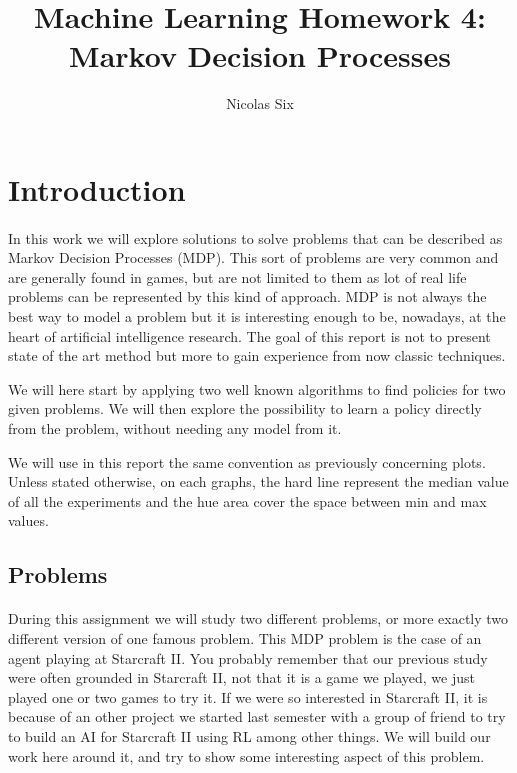 \documentclass[twocolumn,a4paper,10pt]{article}
\title{Machine Learning Homework 4:\\Markov Decision Processes}
\author{Nicolas Six}
\begin{document}
\maketitle \tableofcontents{}


\section{Introduction}

\paragraph{}

In this work we will explore solutions to solve problems that can
be described as Markov Decision Processes (MDP). This sort of problems
are very common and are generally found in games, but are not limited
to them as lot of real life problems can be represented by this kind
of approach. MDP is not always the best way to model a problem but
it is interesting enough to be, nowadays, at the heart of artificial
intelligence research. The goal of this report is not to present state
of the art method but more to gain experience from now classic techniques.

We will here start by applying two well known algorithms to find policies
for two given problems. We will then explore the possibility
to learn a policy directly from the problem, without needing any model
from it.

We will use in this report the same convention as previously concerning
plots. Unless stated otherwise, on each graphs, the hard line represent
the median value of all the experiments and the hue area cover the
space between min and max values.

\subsection{Problems}

\paragraph{}

During this assignment we will study two different problems, or more
exactly two different version of one famous problem. This MDP problem
is the case of an agent playing at Starcraft II. You probably remember
that our previous study were often grounded in Starcraft II, not that
it is a game we played, we just played one or two games to try it. If
we were so interested in Starcraft II, it is because of an other project
we started last semester with a group of friend to try to build an
AI for Starcraft II using RL among other things. We will build our
work here around it, and try to show some interesting aspect of this
problem.
\end{document}
